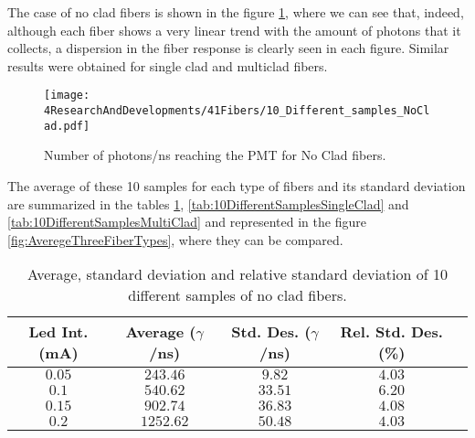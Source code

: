 The case of no clad fibers is shown in the figure \ref{fig:10samplesNC}, where we can see that, indeed, although each fiber shows a very linear trend with the amount of photons that it collects, a dispersion in the fiber response is clearly seen in each figure. Similar results were obtained for single clad and multiclad fibers.



\begin{figure}[h]
\centering
\texttt{[image: 4ResearchAndDevelopments/41Fibers/10\_Different\_samples\_NoClad.pdf]}
\caption{Number of photons/ns reaching the PMT for No Clad fibers.\label{fig:10samplesNC}}
\end{figure}

The average of these 10 samples for each type of fibers and its standard deviation are summarized in the tables \ref{tab:10DifferentSamplesNoClad}, \ref{tab:10DifferentSamplesSingleClad} and \ref{tab:10DifferentSamplesMultiClad} and represented in the figure \ref{fig:AveregeThreeFiberTypes}, where they can be compared. 

\begin{table}[htbp]
\begin{center}
\begin{tabular}{|c|c|c|c|c|}
\hline
Led Int. (mA) & Average ($\gamma$/ns) & Std. Des. ($\gamma$/ns) & Rel. Std. Des. (\%)\\
\hline \hline \hline
$0.05$ & $243.46$ & $9.82$ & $4.03$ \\ \hline
$0.1$ & $540.62$ & $33.51$ & $6.20$ \\ \hline
$0.15$ & $902.74$ & $36.83$ & $4.08$ \\ \hline
$0.2$ & $1252.62$ & $50.48$ & $4.03$ \\ \hline
\end{tabular}
\caption{Average, standard deviation and relative standard deviation of 10 different samples of no clad fibers.}
\label{tab:10DifferentSamplesNoClad}
\end{center}
\end{table}

